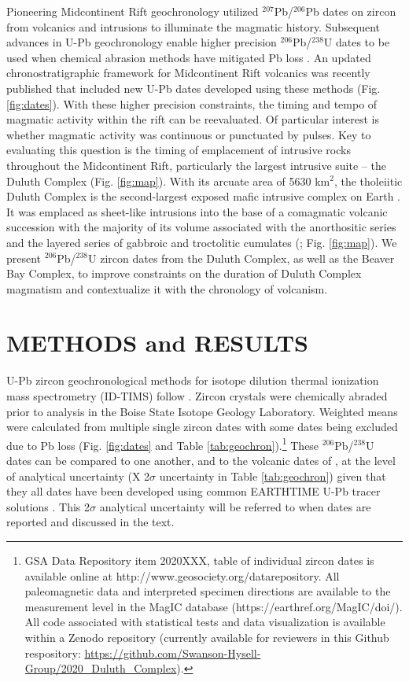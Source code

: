 \documentclass[11pt,letterpaper]{article}
\begin{document}
Pioneering Midcontinent Rift geochronology utilized $^{207}$Pb/$^{206}$Pb dates on zircon from volcanics \citep{Davis1997a} and intrusions \citep{Paces1993a} to illuminate the magmatic history. Subsequent advances in U-Pb geochronology enable higher precision $^{206}$Pb/$^{238}$U dates to be used when chemical abrasion methods have mitigated Pb loss \citep{Mattinson2005a}. An updated chronostratigraphic framework for Midcontinent Rift volcanics was recently published \citep{Swanson-Hysell2019a} that included new U-Pb dates developed using these methods (Fig. \ref{fig:dates}). With these higher precision constraints, the timing and tempo of magmatic activity within the rift can be reevaluated. Of particular interest is whether magmatic activity was continuous or punctuated by pulses. Key to evaluating this question is the timing of emplacement of intrusive rocks throughout the Midcontinent Rift, particularly the largest intrusive suite -- the Duluth Complex (Fig. \ref{fig:map}). With its arcuate area of 5630 km$^2$, the tholeiitic Duluth Complex is the second-largest exposed mafic intrusive complex on Earth \citep{Miller2002c}. It was emplaced as sheet-like intrusions into the base of a comagmatic volcanic succession with the majority of its volume associated with the anorthositic series and the layered series of gabbroic and troctolitic cumulates (\citealp{Miller2002c}; Fig. \ref{fig:map}). We present $^{206}$Pb/$^{238}$U zircon dates from the Duluth Complex, as well as the Beaver Bay Complex, to improve constraints on the duration of Duluth Complex magmatism and contextualize it with the chronology of volcanism.

\section*{METHODS and RESULTS}

U-Pb zircon geochronological methods for isotope dilution thermal ionization mass spectrometry (ID-TIMS) follow \citet{Schmitz2012a}. Zircon crystals were chemically abraded prior to analysis in the Boise State Isotope Geology Laboratory. Weighted means were calculated from multiple single zircon dates with some dates being excluded due to Pb loss (Fig. \ref{fig:dates} and Table \ref{tab:geochron}).\footnote{GSA Data Repository item 2020XXX, table of individual zircon dates is available online at http://www.geosociety.org/datarepository. All paleomagnetic data and interpreted specimen directions are available to the measurement level in the MagIC database (https://earthref.org/MagIC/doi/).  All code associated with statistical tests and data visualization is available within a Zenodo repository (currently available for reviewers in this Github respository: \url{https://github.com/Swanson-Hysell-Group/2020_Duluth_Complex}).} These $^{206}$Pb/$^{238}$U dates can be compared to one another, and to the volcanic dates of \cite{Swanson-Hysell2019a}, at the level of analytical uncertainty (X 2$\sigma$ uncertainty in Table \ref{tab:geochron}) given that they all dates have been developed using common EARTHTIME U-Pb tracer solutions \citep{Condon2015a}. This 2$\sigma$ analytical uncertainty will be referred to when dates are reported and discussed in the text.
\end{document}
